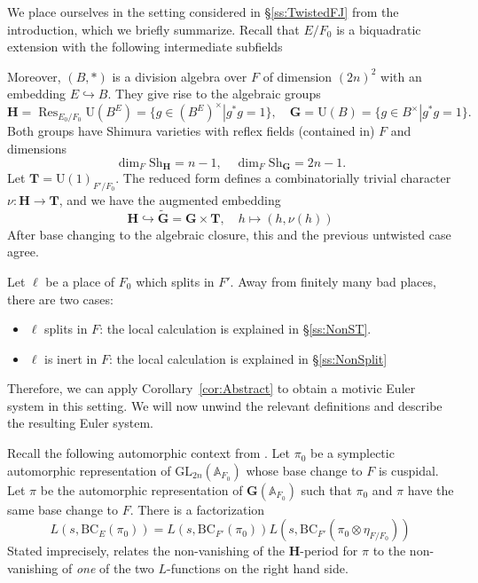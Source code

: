 \documentclass{amsart}
\theoremstyle{definition}
\theoremstyle{remark}
\newcommand{\1}{\mathbf{1}}
\newcommand{\A}{\mathbb{A}}
\newcommand{\GL}{\mathrm{GL}}
\newcommand{\mb}[1]{\mathbf{#1}}
\newcommand{\U}{\mathrm{U}}
\DeclareMathOperator{\Res}{Res}
\theoremstyle{definition}
\newcommand{\bH}{\mathbf{H}}
\newcommand{\bG}{\mathbf{G}}
\newcommand{\Sh}{\mathrm{Sh}}
\newcommand{\BC}{\mathrm{BC}}
\begin{document}
We place ourselves in the setting considered in \S\ref{ss:TwistedFJ} from the introduction, which we briefly summarize. Recall that $E/F_0$ is a biquadratic extension with the following intermediate subfields
\begin{center}
\end{center}
Moreover, $(B,\ast)$ is a division algebra over $F$ of dimension $(2n)^2$ with an embedding $E\hookrightarrow B$. They give rise to the algebraic groups
\[
    \bH=\Res_{E_0/F_0}\U(B^E)=\{g\in (B^E)^\times| g^*g=1\},\quad \bG=\U(B)=\{g\in B^\times|g^*g=1\}.
\]
Both groups have Shimura varieties with reflex fields (contained in) $F$ and dimensions
\[
    \dim_F \Sh_{\mb{H}}=n-1,\quad \dim_F \Sh_{\mb{G}}=2n-1.
\]
Let $\mb{T}=\U(1)_{F'/F_0}$. The reduced form defines a combinatorially trivial character $\nu:\bH\to\mb{T}$, and we have the augmented embedding
\[
    \mb{H}\hookrightarrow\widetilde{\mb{G}}=\bG\times\mb{T},\quad h\mapsto(h,\nu(h))
\]
After base changing to the algebraic closure, this and the previous untwisted case agree.

Let $\ell$ be a place of $F_0$ which splits in $F'$. Away from finitely many bad places, there are two cases:
\begin{itemize}
    \item $\ell$ splits in $F$: the local calculation is explained in \S\ref{ss:NonST}.
    \item $\ell$ is inert in $F$: the local calculation is explained in \S\ref{ss:NonSplit}
\end{itemize}
Therefore, we can apply Corollary~\ref{cor:Abstract} to obtain a motivic Euler system in this setting. We will now unwind the relevant definitions and describe the resulting Euler system.

Recall the following automorphic context from \cite{LXZ-TwistedFL}. Let $\pi_0$ be a symplectic automorphic representation of $\GL_{2n}(\A_{F_0})$ whose base change to $F$ is cuspidal. Let $\pi$ be the automorphic representation of $\mb{G}(\A_{F_0})$ such that $\pi_0$ and $\pi$ have the same base change to $F$. There is a factorization
\begin{equation}\label{eq:TwistedAuto}
    L(s,\BC_E(\pi_0))=L(s,\BC_{F'}(\pi_0))L(s,\BC_{F'}(\pi_0\otimes\eta_{F/F_0}))
\end{equation}
Stated imprecisely, \cite[Conjecture 1.1]{LXZ-TwistedFL} relates the non-vanishing of the $\mb{H}$-period for $\pi$ to the non-vanishing of \emph{one} of the two $L$-functions on the right hand side.
\end{document}
